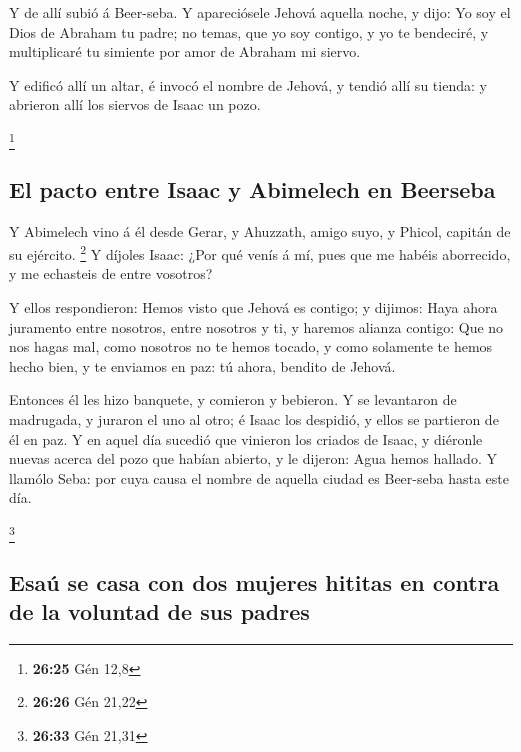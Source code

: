  Y de allí subió á Beer-seba.  Y
apareciósele Jehová aquella noche, y dijo: Yo soy el Dios de Abraham tu
padre; no temas, que yo soy contigo, y yo te bendeciré, y multiplicaré
tu simiente por amor de Abraham mi siervo.

 Y edificó allí un altar, é invocó el nombre de Jehová, y
tendió allí su tienda: y abrieron allí los siervos de Isaac un pozo.

\footnote{\textbf{26:25} Gén 12,8}

\hypertarget{el-pacto-entre-isaac-y-abimelech-en-beerseba}{%
\subsection{El pacto entre Isaac y Abimelech en
Beerseba}\label{el-pacto-entre-isaac-y-abimelech-en-beerseba}}

 Y Abimelech vino á él desde Gerar, y Ahuzzath, amigo
suyo, y Phicol, capitán de su ejército. \footnote{\textbf{26:26} Gén
  21,22}  Y díjoles Isaac: ¿Por qué venís á mí, pues que
me habéis aborrecido, y me echasteis de entre vosotros?

 Y ellos respondieron: Hemos visto que Jehová es contigo;
y dijimos: Haya ahora juramento entre nosotros, entre nosotros y ti, y
haremos alianza contigo:  Que no nos hagas mal, como
nosotros no te hemos tocado, y como solamente te hemos hecho bien, y te
enviamos en paz: tú ahora, bendito de Jehová.

 Entonces él les hizo banquete, y comieron y bebieron.
 Y se levantaron de madrugada, y juraron el uno al otro;
é Isaac los despidió, y ellos se partieron de él en paz. 
Y en aquel día sucedió que vinieron los criados de Isaac, y diéronle
nuevas acerca del pozo que habían abierto, y le dijeron: Agua hemos
hallado.  Y llamólo Seba: por cuya causa el nombre de
aquella ciudad es Beer-seba hasta este día.

\footnote{\textbf{26:33} Gén 21,31}

\hypertarget{esauxfa-se-casa-con-dos-mujeres-hititas-en-contra-de-la-voluntad-de-sus-padres}{%
\subsection{Esaú se casa con dos mujeres hititas en contra de la
voluntad de sus
padres}\label{esauxfa-se-casa-con-dos-mujeres-hititas-en-contra-de-la-voluntad-de-sus-padres}}

